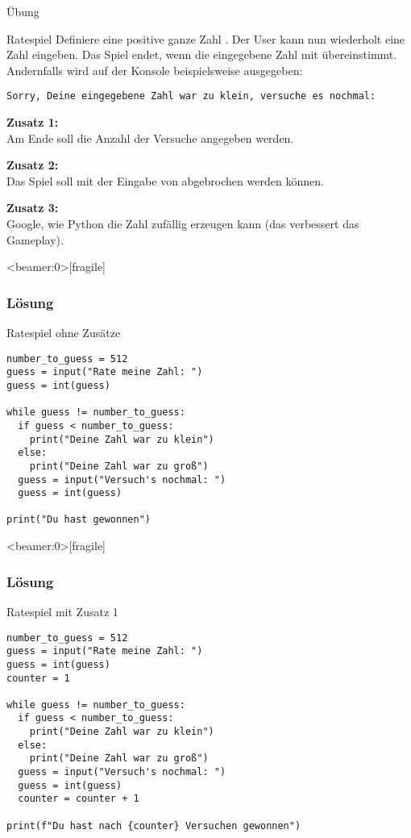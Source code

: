 \begin{frame}{Übung}

\begin{block}{Ratespiel}
\vspace{2pt}
Definiere eine positive ganze Zahl . Der User kann nun wiederholt eine Zahl eingeben. Das Spiel endet, wenn die eingegebene Zahl mit  übereinstimmt. 
Andernfalls wird auf der Konsole beispielsweise ausgegeben: 

\texttt{Sorry, Deine eingegebene Zahl war zu klein, versuche es nochmal: }

\pause
\textbf{Zusatz 1:} \\
Am Ende soll die Anzahl der Versuche angegeben werden.

\pause
\textbf{Zusatz 2:} \\
Das Spiel soll mit der Eingabe von  abgebrochen werden können. 

\pause
\textbf{Zusatz 3:} \\
Google, wie Python die Zahl  zufällig erzeugen kann (das verbessert das Gameplay).  

\end{block}
\end{frame}



\begin{frame}<beamer:0>[fragile]
\frametitle{Lösung}
\begin{solutionblock}{Ratespiel ohne Zusätze}
\begin{verbatim}
number_to_guess = 512
guess = input("Rate meine Zahl: ")
guess = int(guess)

while guess != number_to_guess:
  if guess < number_to_guess:
    print("Deine Zahl war zu klein")
  else:
    print("Deine Zahl war zu groß")
  guess = input("Versuch's nochmal: ")
  guess = int(guess)

print("Du hast gewonnen")
\end{verbatim}
\end{solutionblock}
\end{frame}


\begin{frame}<beamer:0>[fragile]
\frametitle{Lösung}
\begin{solutionblock}{Ratespiel mit Zusatz 1}
\begin{verbatim}
number_to_guess = 512
guess = input("Rate meine Zahl: ")
guess = int(guess)
counter = 1

while guess != number_to_guess:
  if guess < number_to_guess:
    print("Deine Zahl war zu klein")
  else:
    print("Deine Zahl war zu groß")
  guess = input("Versuch's nochmal: ")
  guess = int(guess)
  counter = counter + 1
  
print(f"Du hast nach {counter} Versuchen gewonnen")	
\end{verbatim}
\end{solutionblock}
\end{frame}


